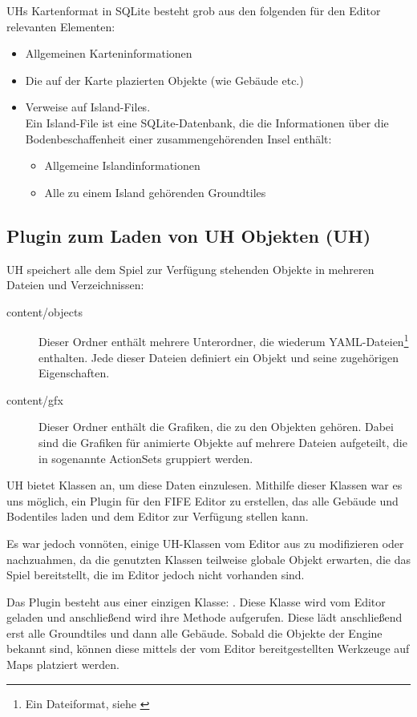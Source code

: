 UHs Kartenformat in SQLite besteht grob aus den folgenden für den
Editor relevanten Elementen:
\begin{itemize}
  \item Allgemeinen Karteninformationen
  \item Die auf der Karte plazierten Objekte (wie Gebäude etc.)
  \item Verweise auf Island-Files. \\
  Ein Island-File ist eine SQLite-Datenbank,
  die die Informationen über die Bodenbeschaffenheit einer zusammengehörenden
  Insel enthält:
  \begin{itemize}
    \item Allgemeine Islandinformationen
    \item Alle zu einem Island gehörenden Groundtiles
  \end{itemize}
\end{itemize}


\subsection{Plugin zum Laden von UH Objekten (UH)}
UH speichert alle dem Spiel zur Verfügung stehenden Objekte in mehreren Dateien
und Verzeichnissen:

\begin{description}
\item[content/objects] Dieser Ordner enthält mehrere Unterordner, die wiederum
YAML-Dateien\footnote{Ein Dateiformat, siehe \cite{yaml}} enthalten. Jede
dieser Dateien definiert ein Objekt und seine zugehörigen Eigenschaften.
\item[content/gfx] Dieser Ordner enthält die Grafiken, die zu den Objekten
gehören. Dabei sind die Grafiken für animierte Objekte auf mehrere Dateien
aufgeteilt, die in sogenannte ActionSets gruppiert werden.
\end{description}

UH bietet Klassen an, um diese Daten einzulesen.
Mithilfe dieser Klassen war es uns möglich, ein
Plugin für den FIFE Editor zu erstellen, das alle Gebäude und Bodentiles
laden und dem Editor zur Verfügung stellen kann.

Es war jedoch vonnöten, einige UH-Klassen vom Editor aus zu
modifizieren oder nachzuahmen, da die genutzten Klassen teilweise
globale Objekt erwarten, die das Spiel bereitstellt, die im Editor
jedoch nicht vorhanden sind.

Das Plugin besteht aus einer einzigen Klasse: . Diese
Klasse wird vom Editor geladen und anschließend wird ihre  Methode
aufgerufen. Diese lädt anschließend erst alle Groundtiles und dann alle Gebäude.
Sobald die Objekte der Engine bekannt sind, können diese mittels der vom Editor
bereitgestellten Werkzeuge auf Maps platziert werden.


